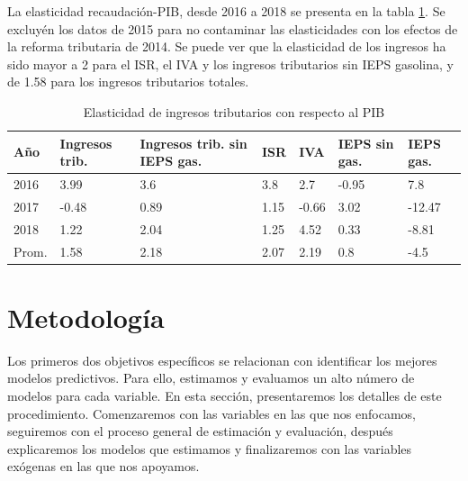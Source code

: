 \documentclass[a4paper, 11pt]{article}
\begin{document}
La elasticidad recaudación-PIB, desde 2016 a 2018 se presenta en la tabla \ref{tab:elast}. Se excluyén los datos de 2015 para no contaminar las elasticidades con los efectos de la reforma tributaria de 2014. Se puede ver que la elasticidad de los ingresos ha sido mayor a 2 para el ISR, el IVA y los ingresos tributarios sin IEPS gasolina, y de 1.58 para los ingresos tributarios totales.
\begin{table}
\centering
\caption{Elasticidad de ingresos tributarios con respecto al PIB}
 \begin{tabular}{ m{2 cm}  m{1.5cm}  m{1.5cm}  m{1.5cm}  m{1.5cm}  m{1.5cm}  m{1.5cm} } 
 Año & Ingresos trib. & Ingresos trib. sin IEPS gas. & ISR & IVA & IEPS sin gas. & IEPS gas.\\ [0.5ex] 
 \hline \hline
 2016 & 3.99 & 3.6 & 3.8 & 2.7 & -0.95 & 7.8 \\ 
 \hline
 2017 & -0.48 & 0.89 & 1.15 & -0.66 & 3.02 & -12.47\\
 \hline
 2018 & 1.22 & 2.04 & 1.25 & 4.52 & 0.33 & -8.81 \\
 \hline\hline
 Prom. & 1.58 & 2.18 & 2.07 & 2.19 & 0.8 & -4.5 \\
 \hline \hline
\end{tabular}
\label{tab:elast}
\end{table}

\section*{Metodología}
Los primeros dos objetivos específicos se relacionan con identificar los mejores modelos predictivos. Para ello, estimamos y evaluamos un alto número de modelos para cada variable. En esta sección, presentaremos los detalles de este procedimiento. Comenzaremos con las variables en las que nos enfocamos, seguiremos con el proceso general de estimación y evaluación, después explicaremos los modelos que estimamos y finalizaremos con las variables exógenas en las que nos apoyamos.
\end{document}
